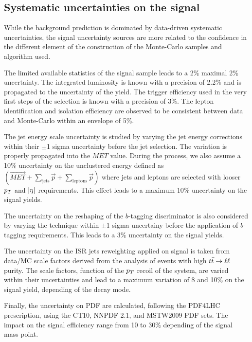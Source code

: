         \subsection{Systematic uncertainties on the signal}

        While the background prediction is dominated by data-driven systematic
        uncertainties, the signal uncertainty sources are more related to the
        confidence in the different element of the construction of the Monte-Carlo
        samples and algorithm used.

        The limited available statistics of the signal sample leads to a 2\% maximal
        2\% uncertainty. The integrated luminosity is known with a precision of 2.2\%
        and is propagated to the uncertainty of the yield. The trigger efficiency
        used in the very first steps of the selection is known with a precision of 3\%.
        The lepton identification and isolation efficiency are observed to be consistent
        between data and Monte-Carlo within an envelope of 5\%.

        The jet energy scale uncertainty is studied by varying the jet energy corrections
        within their $\pm$1 sigma uncertainty before the jet selection. The variation is
        properly propagated into the $MET$ value. During the process, we also assume a 
        10\% uncertainty on the unclustered energy defined as $(\vec{MET} + \sum_\text{jets}
        \vec{p} + \sum_\text{leptons} \vec{p})$ where jets and leptons are selected with looser
        $p_T$ and $\left| \eta \right|$ requirements. This effect leads to a maximum 10\% uncertainty on
        the signal yields.

        The uncertainty on the reshaping of the $b$-tagging discriminator is also considered
        by varying the technique within $\pm$1 sigma uncertainy before the application of
        $b$-tagging requirements. This leads to a 3\% uncertainty on the signal yields.

        The uncertainty on the ISR jets reweighting applied on signal is taken from data/MC
        scale factors derived from the analysis of events with high $t\bar{t} \rightarrow \ell \ell$ purity. The
        scale factors, function of the $p_T$ recoil of the system, are varied within their
        uncertainties and lead to a maximum variation of 8 and 10\% on the signal yield, depending
        of the decay mode.

        Finally, the uncertainty on PDF are calculated, following the PDF4LHC prescription,
        using the CT10, NNPDF 2.1, and MSTW2009 PDF sets.  The impact on the
        signal efficiency range from 10 to 30\% depending of the signal mass point. 

